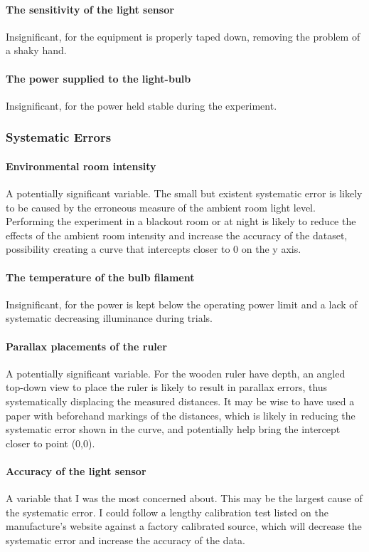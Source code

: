 \documentclass[a4paper,12pt]{article}
\begin{document}
\paragraph{The sensitivity of the light sensor} Insignificant, for the equipment is properly taped down, removing the problem of a shaky hand.

\paragraph{The power supplied to the light-bulb}
Insignificant, for the power held stable during the experiment.

\subsubsection{Systematic Errors}
\paragraph{Environmental room intensity}
A potentially significant variable. The small but existent systematic error is likely to be caused by the erroneous measure of the ambient room light level. Performing the experiment in a blackout room or at night is likely to reduce the effects of the ambient room intensity and increase the accuracy of the dataset, possibility creating a curve that intercepts closer to 0 on the y axis.

\paragraph{The temperature of the bulb filament}
Insignificant, for the power is kept below the operating power limit and a lack of systematic decreasing illuminance during trials.

\paragraph{Parallax placements of the ruler}
A potentially significant variable. For the wooden ruler have depth, an angled top-down view to place the ruler is likely to result in parallax errors, thus systematically displacing the measured distances. It may be wise to have used a paper with beforehand markings of the distances, which is likely in reducing the systematic error shown in the curve, and potentially help bring the intercept closer to point (0,0).

\paragraph{Accuracy of the light sensor}
A variable that I was the most concerned about. This may be the largest cause of the systematic error. I could follow a lengthy calibration test listed on the manufacture's website against a factory calibrated source, which will decrease the systematic error and increase the accuracy of the data.

\newpage
\nocite{*}
\printbibliography
\end{document}
